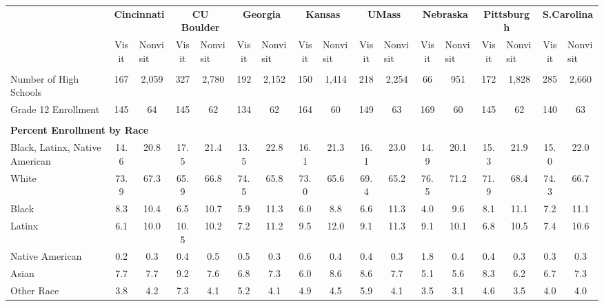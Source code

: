 \begin{tabular*}{\linewidth}{@{\extracolsep{\fill} } lcccccccccccccccc}%
&\multicolumn{2}{c}{\bfseries Cincinnati}&\multicolumn{2}{c}{\bfseries CU Boulder}&\multicolumn{2}{c}{\bfseries Georgia}&\multicolumn{2}{c}{\bfseries Kansas}&\multicolumn{2}{c}{\bfseries UMass}&\multicolumn{2}{c}{\bfseries Nebraska}&\multicolumn{2}{c}{\bfseries Pittsburgh}&\multicolumn{2}{c}{\bfseries S.Carolina}\\%
&Visit&\multicolumn{1}{l}{Nonvisit}&Visit&\multicolumn{1}{l}{Nonvisit}&Visit&\multicolumn{1}{l}{Nonvisit}&Visit&\multicolumn{1}{l}{Nonvisit}&Visit&\multicolumn{1}{l}{Nonvisit}&Visit&\multicolumn{1}{l}{Nonvisit}&Visit&\multicolumn{1}{l}{Nonvisit}&Visit&\multicolumn{1}{l}{Nonvisit}\\%
\hline%
&&&&&&&&&&&&&&&&\\%
\hspace{0cm}Number of High Schools&167&2,059&327&2,780&192&2,152&150&1,414&218&2,254&66&951&172&1,828&285&2,660\\%
\hspace{0cm}Grade 12 Enrollment&145&64&145&62&134&62&164&60&149&63&169&60&145&62&140&63\\%
&&&&&&&&&&&&&&&&\\%
\multicolumn{17}{l}{\bfseries Percent Enrollment by Race}\\%
\hspace{0.2cm}Black, Latinx, Native American&14.6&20.8&17.5&21.4&13.5&22.8&16.1&21.3&16.1&23.0&14.9&20.1&15.3&21.9&15.0&22.0\\%
\hspace{0.2cm}White&73.9&67.3&65.9&66.8&74.5&65.8&73.0&65.6&69.4&65.2&76.5&71.2&71.9&68.4&74.3&66.7\\%
\hspace{0.2cm}Black&8.3&10.4&6.5&10.7&5.9&11.3&6.0&8.8&6.6&11.3&4.0&9.6&8.1&11.1&7.2&11.1\\%
\hspace{0.2cm}Latinx&6.1&10.0&10.5&10.2&7.2&11.2&9.5&12.0&9.1&11.3&9.1&10.1&6.8&10.5&7.4&10.6\\%
\hspace{0.2cm}Native American&0.2&0.3&0.4&0.5&0.5&0.3&0.6&0.4&0.4&0.3&1.8&0.4&0.4&0.3&0.3&0.3\\%
\hspace{0.2cm}Asian&7.7&7.7&9.2&7.6&6.8&7.3&6.0&8.6&8.6&7.7&5.1&5.6&8.3&6.2&6.7&7.3\\%
\hspace{0.2cm}Other Race&3.8&4.2&7.3&4.1&5.2&4.1&4.9&4.5&5.9&4.1&3.5&3.1&4.6&3.5&4.0&4.0\\%

\end{tabular*}
